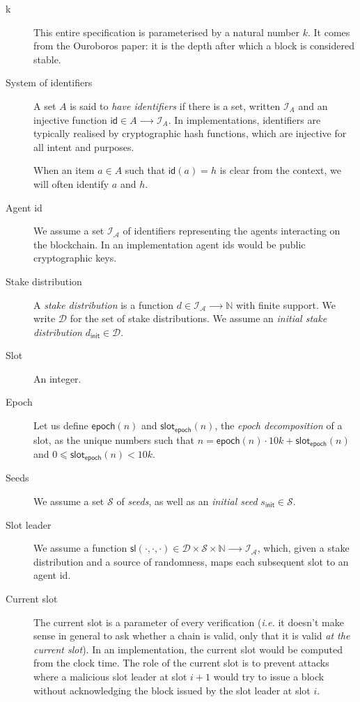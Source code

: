 \documentclass{article}
\newcommand{\idsof}[1]{\mathcal{I}\!_#1}
\newcommand{\id}{\mathsf{id}}
\newcommand{\agentids}{\idsof{\mathcal{A}}}
\newcommand{\slotleader}[3]{\mathsf{sl}(#1,#2,#3)}
\newcommand{\stakedistributions}{\mathcal{D}}
\newcommand{\seeds}{\mathcal{S}}
\newcommand{\initialdistribution}{d_{\mathsf{init}}}
\newcommand{\initialseed}{s_{\mathsf{init}}}
\newcommand{\epoch}[1]{\mathsf{epoch}(#1)}
\newcommand{\epochslot}[1]{\mathsf{slot}_\mathsf{epoch}(#1)}
\begin{document}
\begin{description}
\item[k] This entire specification is parameterised by a natural
  number $k$. It comes from the Ouroboros paper: it is the depth after
  which a block is considered stable.

\item[System of identifiers] A set $A$ is said to \emph{have
    identifiers} if there is a set, written $\idsof{A}$ and an
  injective function $\id ∈ A ⟶ \idsof{A}$. In implementations,
  identifiers are typically realised by cryptographic hash functions,
  which are injective for all intent and purposes.

  When an item $a∈A$ such that $\id(a) = h$ is clear from the context,
  we will often identify $a$ and $h$.

\item[Agent id] We assume a set $\agentids$ of identifiers
  representing the agents interacting on the blockchain. In an
  implementation agent ids would be public cryptographic keys.

\item[Stake distribution] A \emph{stake distribution} is a function
  $d ∈ \agentids ⟶ ℕ$ with finite support. We write
  $\stakedistributions$ for the set of stake distributions. We assume
  an \emph{initial stake distribution}
  $\initialdistribution ∈ \stakedistributions$.

\item[Slot] An integer.

\item[Epoch] Let us define $\epoch{n}$ and $\epochslot{n}$, the
  \emph{epoch decomposition} of a slot, as the unique numbers such
  that $n=\epoch{n}\cdot 10k+\epochslot{n}$ and $0⩽ \epochslot{n} < 10k$.

\item[Seeds] We assume a set $\seeds$ of \emph{seeds}, as well
  as an \emph{initial seed} $\initialseed ∈ \seeds$.

\item[Slot leader] We assume a function $\slotleader{⋅}{⋅}{⋅} ∈
  \stakedistributions×\seeds×ℕ ⟶ \agentids$, which, given a stake distribution
  and a source of randomness, maps each subsequent slot to an agent id.

\item[Current slot] The current slot is a parameter of every verification
  (\emph{i.e.} it doesn't make sense in general to ask whether a chain is valid,
  only that it is valid \emph{at the current slot}). In an implementation, the
  current slot would be computed from the clock time. The role of the current
  slot is to prevent attacks where a malicious slot leader at slot $i+1$ would
  try to issue a block without acknowledging the block issued by the slot leader
  at slot $i$.


\end{description}
\end{document}
